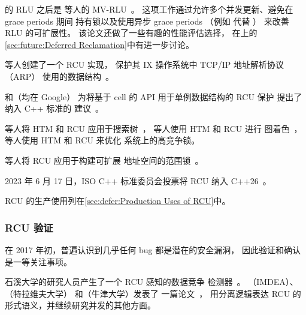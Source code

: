 的 RLU 之后是
等人的 MV-RLU~\cite{Kim:2019:MSR:3297858.3304040}。
这项工作通过允许多个并发更新、避免在 grace periods 期间
持有锁以及使用异步 grace periods
（例如  代替 ）
来改善 RLU 的可扩展性。
该论文还做了一些有趣的性能评估选择，
在上的
\cref{sec:future:Deferred Reclamation}中有进一步讨论。

等人创建了一个 RCU 实现，
保护其 IX 操作系统中 TCP/IP 地址解析协议（ARP）
使用的数据结构~\cite{Belay:2016:IOS:3014162.2997641}。

和（均在 Google）
为将基于 cell 的 API 用于单例数据结构的 RCU 保护
提出了纳入 C++ 标准的
建议~\cite{GeoffRomer2018C++DeferredReclamationP0561R4}。

等人将
HTM 和 RCU 应用于搜索树~\cite{Siakavaras2017CombiningHA,DimitriosSiakavaras2020RCU-HTM-B+Trees}，
等人使用 HTM 和 RCU 进行
图着色~\cite{ChristinaGiannoula2018HTM-RCU-graphcoloring}，
等人使用 HTM 和 RCU 来优化
系统上的高竞争锁。

等人将 RCU 应用于构建可扩展
地址空间的范围锁~\cite{AlexKogan2020RCUrangelocks}。

2023 年 6 月 17 日，ISO C++ 标准委员会投票将 RCU
纳入 C++26~\cite{PaulEMcKennney2023C++26RCU4}。

RCU 的生产使用列在\cref{sec:defer:Production Uses of RCU}中。

\subsubsection{RCU 验证}
\label{sec:defer:RCU Validation}

在 2017 年初，普遍认识到几乎任何 bug 都是潜在的安全漏洞，
因此验证和确认是一等关注事项。

石溪大学的研究人员产生了一个 RCU 感知的数据竞争
检测器~\cite{AbhinavDuggal2010Masters,JustinSeyster2012PhD,Seyster:2011:RFA:2075416.2075425}。
（IMDEA）、（特拉维夫大学）
和（牛津大学）发表了
一篇论文~\cite{AlexeyGotsman2012VerifyGraceExtended}，
用分离逻辑表达 RCU 的形式语义，并继续研究并发的其他方面。


